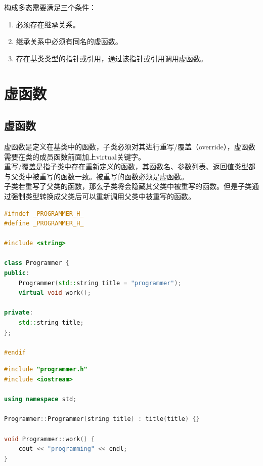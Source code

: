 构成多态需要满足三个条件：

\begin{enumerate}
	\item 必须存在继承关系。
	\item 继承关系中必须有同名的虚函数。
	\item 存在基类类型的指针或引用，通过该指针或引用调用虚函数。
\end{enumerate}

\newpage

\section{虚函数}

\subsection{虚函数}

虚函数是定义在基类中的函数，子类必须对其进行重写/覆盖（override），虚函数需要在类的成员函数前面加上virtual关键字。\\

重写/覆盖是指子类中存在重新定义的函数，其函数名、参数列表、返回值类型都与父类中被重写的函数一致。被重写的函数必须是虚函数。\\

子类若重写了父类的函数，那么子类将会隐藏其父类中被重写的函数。但是子类通过强制类型转换成父类后可以重新调用父类中被重写的函数。\\


\begin{lstlisting}[language=C++, title=programmer.h]
#ifndef _PROGRAMMER_H_
#define _PROGRAMMER_H_

#include <string>

class Programmer {
public:
	Programmer(std::string title = "programmer");
	virtual void work();
	
private:
	std::string title;
};

#endif
\end{lstlisting}

\begin{lstlisting}[language=C++, title=programmer.cpp]
#include "programmer.h"
#include <iostream>

using namespace std;

Programmer::Programmer(string title) : title(title) {}

void Programmer::work() {
	cout << "programming" << endl;
}
\end{lstlisting}

